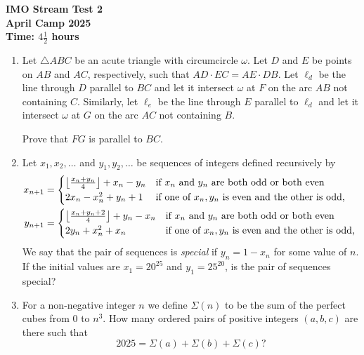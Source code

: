 \documentclass[12pt]{article}
\begin{document}
\thispagestyle{empty}

\begin{center}
  \textbf{\Large IMO Stream Test 2}
  \\ \vspace{1em}
  \textbf{\large April Camp 2025}
  \\ \vspace{1em}
  \textbf{\large Time: $4\frac{1}{2}$ hours}
\end{center}

\begin{enumerate}[leftmargin=0pt,topsep=2\bigskipamount,itemsep=\medskipamount]

\item Let $\triangle ABC$ be an acute triangle with circumcircle $\omega$. Let $D$ and $E$ be points on $AB$ and $AC$, respectively, such that $AD\cdot EC = AE\cdot DB$. Let $\ell_d$ be the line through $D$ parallel to $BC$ and let it intersect $\omega$ at $F$ on the arc $AB$ not containing $C$. Similarly, let $\ell_e$ be the line through $E$ parallel to $\ell_d$ and let it intersect $\omega$ at $G$ on the arc $AC$ not containing $B$.

\vspace{0.2cm}
Prove that $FG$ is parallel to $BC$.

\item Let $x_1,x_2,\dotsc$ and $y_1,y_2,\dotsc$ be sequences of integers defined recursively by
\begin{align*}
    x_{n+1} &= \begin{cases*}
        \left\lfloor \frac{x_n+y_n}{4} \right\rfloor +x_n -y_n & if $x_n$ and $y_n$ are both odd or both even \\
        2x_n -x_n^2 +y_n +1 & if one of $x_n,y_n$ is even and the other is odd,
    \end{cases*} \\
    y_{n+1} &= \begin{cases*}
        \left\lfloor \frac{x_n+y_n+2}{4} \right\rfloor +y_n -x_n & if $x_n$ and $y_n$ are both odd or both even \\
        2y_n +x_n^2 +x_n & if one of $x_n,y_n$ is even and the other is odd,
    \end{cases*}
\end{align*}
We say that the pair of sequences is \emph{special} if $y_n = 1-x_n$ for some value of $n$.
If the initial values are $x_1 = 20^{25}$ and $y_1 = 25^{20}$, is the pair of sequences special?

\item For a non-negative integer $n$ we define $\Sigma (n)$ to be the sum of the perfect cubes from $0$ to $n^3$.
How many ordered pairs of positive integers $(a, b, c)$ are there such that 
\[
2025 = \Sigma (a) + \Sigma (b) + \Sigma (c)?
\]

\end{enumerate}
\end{document}
